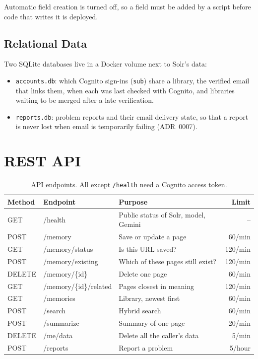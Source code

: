 Automatic field creation is turned off, so a field must be added by a
script before code that writes it is deployed.

\subsection{Relational Data}

Two SQLite databases live in a Docker volume next to Solr's data:

\begin{itemize}
  \item \texttt{accounts.db}: which Cognito sign-ins (\texttt{sub}) share a
  library, the verified email that links them, when each was last checked
  with Cognito, and libraries waiting to be merged after a late
  verification.
  \item \texttt{reports.db}: problem reports and their email delivery
  state, so that a report is never lost when email is temporarily failing
  (ADR~0007).
\end{itemize}

\section{REST API}

\begin{table}[H]
\centering
\footnotesize
\begin{tabularx}{\textwidth}{>{\ttfamily}p{} >{\ttfamily}p{} L r}
\toprule
\textrm{\textbf{Method}} & \textrm{\textbf{Endpoint}} & \textbf{Purpose} & \textbf{Limit} \\
\midrule
GET & /health & Public status of Solr, model, Gemini & -- \\
POST & /memory & Save or update a page & 60/min \\
GET & /memory/status & Is this URL saved? & 120/min \\
POST & /memory/existing & Which of these pages still exist? & 120/min \\
DELETE & /memory/\{id\} & Delete one page & 60/min \\
GET & /memory/\{id\}/related & Pages closest in meaning & 120/min \\
GET & /memories & Library, newest first & 60/min \\
POST & /search & Hybrid search & 60/min \\
POST & /summarize & Summary of one page & 20/min \\
DELETE & /me/data & Delete all the caller's data & 5/min \\
POST & /reports & Report a problem & 5/hour \\
\bottomrule
\end{tabularx}
\caption{API endpoints. All except \texttt{/health} need a Cognito access token.}
\label{tab:api}
\end{table}

